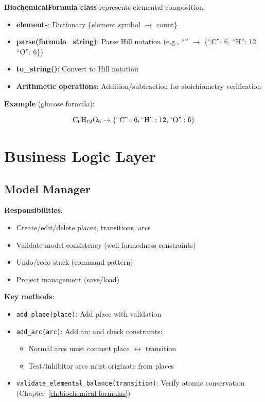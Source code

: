 \textbf{BiochemicalFormula class} represents elemental composition:

\begin{itemize}
    \item \textbf{elements}: Dictionary \{element symbol $\to$ count\}
    \item \textbf{parse(formula\_string)}: Parse Hill notation (e.g., ``'' $\to$ \{``C'': 6, ``H'': 12, ``O'': 6\})
    \item \textbf{to\_string()}: Convert to Hill notation
    \item \textbf{Arithmetic operations}: Addition/subtraction for stoichiometry verification
\end{itemize}

\textbf{Example} (glucose formula):

\begin{equation}
\ce{C6H12O6} \to \{\text{``C''}: 6, \text{``H''}: 12, \text{``O''}: 6\}
\end{equation}

\section{Business Logic Layer}
\label{sec:business-logic}

\subsection{Model Manager}
\label{subsec:model-manager}

\textbf{Responsibilities}:

\begin{itemize}
    \item Create/edit/delete places, transitions, arcs
    \item Validate model consistency (well-formedness constraints)
    \item Undo/redo stack (command pattern)
    \item Project management (save/load)
\end{itemize}

\textbf{Key methods}:

\begin{itemize}
    \item \texttt{add\_place(place)}: Add place with validation
    \item \texttt{add\_arc(arc)}: Add arc and check constraints:
    \begin{itemize}
        \item Normal arcs must connect place $\leftrightarrow$ transition
        \item Test/inhibitor arcs must originate from places
    \end{itemize}
    \item \texttt{validate\_elemental\_balance(transition)}: Verify atomic conservation (Chapter~\ref{ch:biochemical-formulas})
\end{itemize}

